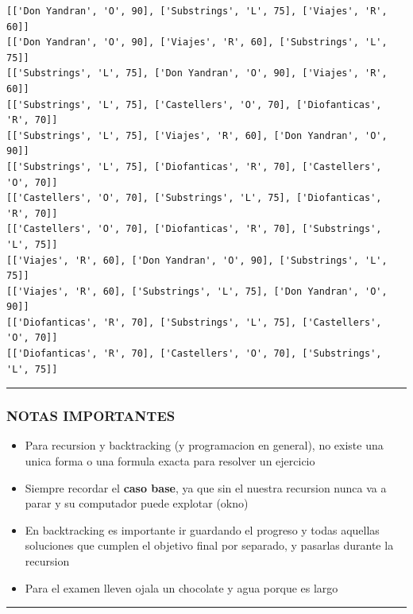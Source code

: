 \documentclass[11pt]{article}
\providecommand{\tightlist}{%
      \setlength{\itemsep}{0pt}\setlength{\parskip}{0pt}}
\begin{document}
    \begin{Verbatim}[commandchars=\\\{\}]
[['Don Yandran', 'O', 90], ['Substrings', 'L', 75], ['Viajes', 'R', 60]]
[['Don Yandran', 'O', 90], ['Viajes', 'R', 60], ['Substrings', 'L', 75]]
[['Substrings', 'L', 75], ['Don Yandran', 'O', 90], ['Viajes', 'R', 60]]
[['Substrings', 'L', 75], ['Castellers', 'O', 70], ['Diofanticas', 'R', 70]]
[['Substrings', 'L', 75], ['Viajes', 'R', 60], ['Don Yandran', 'O', 90]]
[['Substrings', 'L', 75], ['Diofanticas', 'R', 70], ['Castellers', 'O', 70]]
[['Castellers', 'O', 70], ['Substrings', 'L', 75], ['Diofanticas', 'R', 70]]
[['Castellers', 'O', 70], ['Diofanticas', 'R', 70], ['Substrings', 'L', 75]]
[['Viajes', 'R', 60], ['Don Yandran', 'O', 90], ['Substrings', 'L', 75]]
[['Viajes', 'R', 60], ['Substrings', 'L', 75], ['Don Yandran', 'O', 90]]
[['Diofanticas', 'R', 70], ['Substrings', 'L', 75], ['Castellers', 'O', 70]]
[['Diofanticas', 'R', 70], ['Castellers', 'O', 70], ['Substrings', 'L', 75]]

    \end{Verbatim}

    \begin{center}\rule{0.5\linewidth}{\linethickness}\end{center}

\hypertarget{notas-importantes}{%
\subsubsection{NOTAS IMPORTANTES}\label{notas-importantes}}

\begin{itemize}
\tightlist
\item
  Para recursion y backtracking (y programacion en general), no existe
  una unica forma o una formula exacta para resolver un ejercicio
\item
  Siempre recordar el \textbf{caso base}, ya que sin el nuestra
  recursion nunca va a parar y su computador puede explotar (okno)
\item
  En backtracking es importante ir guardando el progreso y todas
  aquellas soluciones que cumplen el objetivo final por separado, y
  pasarlas durante la recursion
\item
  Para el examen lleven ojala un chocolate y agua porque es largo
\end{itemize}

    \begin{center}\rule{0.5\linewidth}{\linethickness}\end{center}
\end{document}
